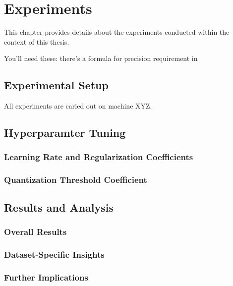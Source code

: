 \chapter{Experiments\label{cha:chapter4}}
This chapter provides details about the experiments conducted within the context of this thesis. 

You'll need these:
there's a formula for precision requirement in \cite{soroosh2018adaptive}

\section{Experimental Setup}
\label{sec:setup}
All experiments are caried out on machine XYZ. 

\section{Hyperparamter Tuning}
\label{sec:hyperparameter}

\subsection{Learning Rate and Regularization Coefficients}
\label{subsec:learning rate}

\subsection{Quantization Threshold Coefficient}
\label{subsec:penalty rate}

\section{Results and Analysis}
\label{sec:dataset}

\subsection{Overall Results}
\label{subsec:overallresults}

\subsection{Dataset-Specific Insights}
\label{subsec:cifat10}

\subsection{Further Implications}
\label{subsec:imagenette}



